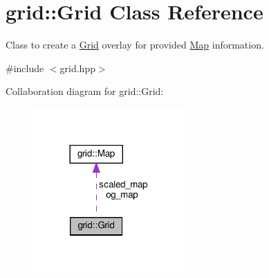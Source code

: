 \hypertarget{classgrid_1_1Grid}{}\section{grid\+:\+:Grid Class Reference}
\label{classgrid_1_1Grid}


Class to create a \hyperlink{classgrid_1_1Grid}{Grid} overlay for provided \hyperlink{structgrid_1_1Map}{Map} information.  




{\ttfamily \#include $<$grid.\+hpp$>$}



Collaboration diagram for grid\+:\+:Grid\+:\nopagebreak
\begin{figure}[H]
\begin{center}
\leavevmode
\includegraphics[width=165pt]{dc/d43/classgrid_1_1Grid__coll__graph}
\end{center}
\end{figure}
